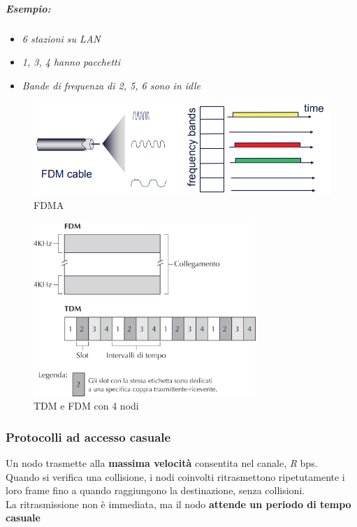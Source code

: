 \documentclass[12pt]{article}
\begin{document}
    \subparagraph{\textit{Esempio:}}
    \begin{itemize}
        \item \textit{6 stazioni su LAN}
        \item \textit{1, 3, 4 hanno pacchetti}
        \item \textit{Bande di frequenza di 2, 5, 6 sono in idle}
    \end{itemize}
    \begin{figure}[!htb]
        \centering
        \includegraphics[width=1\textwidth]{FDMA.PNG}
        \caption{FDMA}
    \end{figure}
    \FloatBarrier
    \begin{figure}[!htb]
        \centering
        \includegraphics[width=0.75\textwidth]{tdmafdma.png}
        \caption{TDM e FDM con 4 nodi}
    \end{figure}
    \FloatBarrier

    \subsubsection{Protocolli ad accesso casuale}
    Un nodo trasmette alla \textbf{massima velocità} consentita nel canale, \textit{R} bps.\\[12pt]
    Quando si verifica una collisione, i nodi coinvolti ritrasmettono ripetutamente i loro frame fino a quando raggiungono la destinazione, senza collisioni. \\
    La ritrasmissione non è immediata, ma il nodo \textbf{attende un periodo di tempo casuale}
\end{document}
